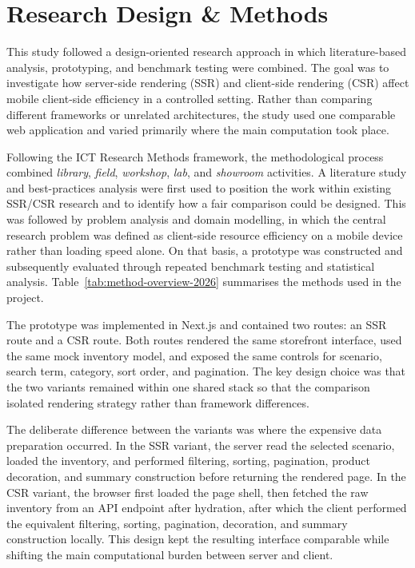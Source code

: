 \section{Research Design \& Methods}

This study followed a design-oriented research approach in which literature-based analysis, prototyping, and benchmark testing were combined. The goal was to investigate how server-side rendering (SSR) and client-side rendering (CSR) affect mobile client-side efficiency in a controlled setting. Rather than comparing different frameworks or unrelated architectures, the study used one comparable web application and varied primarily where the main computation took place.

Following the ICT Research Methods framework, the methodological process combined \textit{library}, \textit{field}, \textit{workshop}, \textit{lab}, and \textit{showroom} activities. A literature study and best-practices analysis were first used to position the work within existing SSR/CSR research and to identify how a fair comparison could be designed. This was followed by problem analysis and domain modelling, in which the central research problem was defined as client-side resource efficiency on a mobile device rather than loading speed alone. On that basis, a prototype was constructed and subsequently evaluated through repeated benchmark testing and statistical analysis. Table~\ref{tab:method-overview-2026} summarises the methods used in the project.

The prototype was implemented in Next.js and contained two routes: an SSR route and a CSR route. Both routes rendered the same storefront interface, used the same mock inventory model, and exposed the same controls for scenario, search term, category, sort order, and pagination. The key design choice was that the two variants remained within one shared stack so that the comparison isolated rendering strategy rather than framework differences.

The deliberate difference between the variants was where the expensive data preparation occurred. In the SSR variant, the server read the selected scenario, loaded the inventory, and performed filtering, sorting, pagination, product decoration, and summary construction before returning the rendered page. In the CSR variant, the browser first loaded the page shell, then fetched the raw inventory from an API endpoint after hydration, after which the client performed the equivalent filtering, sorting, pagination, decoration, and summary construction locally. This design kept the resulting interface comparable while shifting the main computational burden between server and client.

